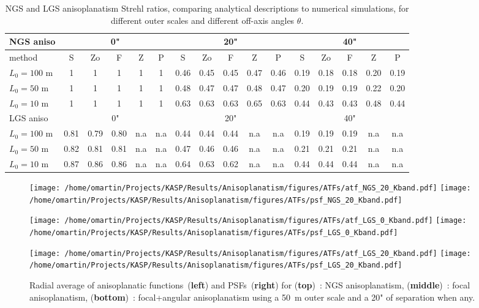 \documentclass[12pt]{article}
\begin{document}
\begin{table}[h!] \label{T:res}
	\centering
	\footnotesize
	\begin{tabular}{|l|c|c|c|c|c|c|c|c|c|c|c|c|c|c|c|}
		\hline
		\rowcolor{blue!50} NGS aniso & \multicolumn{5}{c|}{0"} & \multicolumn{5}{c|}{20"} & \multicolumn{5}{c|}{40"}\\
		\hline
		method & S & Zo & F & Z & P & S & Zo & F & Z & P & S & Zo & F & Z & P \\ 
		\hline
		$L_0=100$ m & 1 &1 &1 &1 &1 & 0.46	& 0.45 &0.45 &0.47 & 0.46& 0.19& 0.18& 0.18&0.20 & 0.19\\
		\hline
		$L_0=50$ m  & 1 &1 &1 &1 &1 & 0.48 &0.47 & 0.47 & 0.48&	0.47& 0.20 &0.19 &0.19&	0.22 &0.20 \\
		\hline
		$L_0=10$ m  & 1 &1 &1 &1 &1 & 0.63&	0.63 &0.63&	0.65&	0.63&	0.44&	0.43&	0.43&	0.48&	0.44 \\
		\hline
		\rowcolor{orange!50} LGS aniso & \multicolumn{5}{c|}{0"} & \multicolumn{5}{c|}{20"} & \multicolumn{5}{c|}{40"}\\
		\hline
		$L_0=100$ m & 0.81 &0.79 &	0.80 &	n.a& n.a&0.44&0.44&	0.44&n.a&	n.a&	0.19&	0.19&	0.19&	n.a&n.a\\
		\hline
		$L_0=50$ m & 0.82 &0.81&	0.81&	n.a& n.a&	0.47&	0.46&	0.46&	n.a &n.a&	0.21&	0.21&	0.21&	n.a&n.a \\		
		\hline
		$L_0=10$ m & 0.87 &0.86&	0.86 &n.a& n.a&0.64&	0.63&	0.62&	n.a& n.a&	0.44&	0.44&	0.44&n.a& n.a \\
		\hline
	\end{tabular}
\caption{\small NGS and LGS anisoplanatism Strehl ratios, comparing analytical descriptions to numerical simulations, for different
	outer scales and different off-axis angles $\theta$.}
\end{table}

\begin{figure}[H] \label{F:atf}	
	\centering
	\texttt{[image: /home/omartin/Projects/KASP/Results/Anisoplanatism/figures/ATFs/atf\_NGS\_20\_Kband.pdf]}\hspace{1cm}	
	\texttt{[image: /home/omartin/Projects/KASP/Results/Anisoplanatism/figures/ATFs/psf\_NGS\_20\_Kband.pdf]}
	
	\texttt{[image: /home/omartin/Projects/KASP/Results/Anisoplanatism/figures/ATFs/atf\_LGS\_0\_Kband.pdf]}\hspace{1cm}	
	\texttt{[image: /home/omartin/Projects/KASP/Results/Anisoplanatism/figures/ATFs/psf\_LGS\_0\_Kband.pdf]}
	
	\texttt{[image: /home/omartin/Projects/KASP/Results/Anisoplanatism/figures/ATFs/atf\_LGS\_20\_Kband.pdf]}\hspace{1cm}	
	\texttt{[image: /home/omartin/Projects/KASP/Results/Anisoplanatism/figures/ATFs/psf\_LGS\_20\_Kband.pdf]}
	\caption{Radial average of anisoplanatic functions~(\textbf{left}) and PSFs~(\textbf{right}) for (\textbf{top})~: NGS anisoplanatism, (\textbf{middle})~: focal anisoplanatism, (\textbf{bottom})~: focal+angular anisoplanatism  using a 50~m outer scale and a 20" of separation when any.}
\end{figure}
\end{document}
